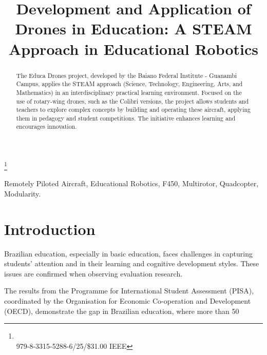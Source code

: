 \documentclass[conference]{IEEEtran}
\begin{document}
\title{Development and Application of Drones in Education: A STEAM Approach in Educational Robotics}


\maketitle
\let\thefootnote\relax\footnote{\\979-8-3315-5288-6/25/\$31.00 IEEE}

\begin{abstract}
The Educa Drones project, developed by the Baiano Federal Institute - Guanambi Campus, applies the STEAM approach (Science, Technology, Engineering, Arts, and Mathematics) in an interdisciplinary practical learning environment. Focused on the use of rotary-wing drones, such as the Colibri versions, the project allows students and teachers to explore complex concepts by building and operating these aircraft, applying them in pedagogy and student competitions. The initiative enhances learning and encourages innovation.
\end{abstract}

\begin{IEEEkeywords}
Remotely Piloted Aircraft, Educational Robotics, F450, Multirotor, Quadcopter, Modularity.
\end{IEEEkeywords}

\section{Introduction}

Brazilian education, especially in basic education, faces challenges in capturing students' attention and in their learning and cognitive development styles. These issues are confirmed when observing evaluation research.

The results from the Programme for International Student Assessment (PISA), coordinated by the Organisation for Economic Co-operation and Development (OECD), demonstrate the gap in Brazilian education, where more than 50%
\end{document}
